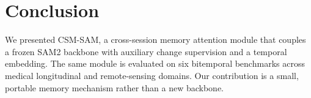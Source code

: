 \section{Conclusion}
\label{sec:conclusion}

We presented CSM-SAM, a cross-session memory attention module that
couples a frozen SAM2 backbone with auxiliary change supervision and a
temporal embedding. The same module is evaluated on six bitemporal
benchmarks across medical longitudinal and remote-sensing domains. Our
contribution is a small, portable memory mechanism rather than a new
backbone.
